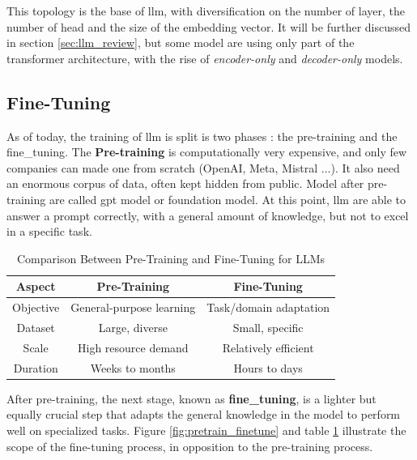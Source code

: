 This topology is the base of \acrshort{llm}, with diversification on the number of layer, the number of head and the size of the embedding vector. It will be further discussed in section \ref{sec:llm_review}, but some model are using only part of the \gls{transformer} architecture, with the rise of \textit{encoder-only} and \textit{decoder-only} models.

\subsection{Fine-Tuning}
\label{sec:fine_tune}
As of today, the training of \acrshort{llm} is split is two phases : the pre-training and the \gls{fine_tuning}. The \textbf{Pre-training} is computationally very expensive, and only few companies can made one from scratch (OpenAI, Meta, Mistral ...). It also need an enormous corpus of data, often kept hidden from public. Model after pre-training are called \acrfull{gpt} model or foundation model. At this point, \acrshort{llm} are able to answer a prompt correctly, with a general amount of knowledge, but not to excel in a specific task.

\begin{table}[h!]
    \centering
    \begin{tabular}{|c|c|c|}
        \hline
        \textbf{Aspect} & \textbf{Pre-Training} & \textbf{Fine-Tuning} \\
        \hline
        Objective & General-purpose learning & Task/domain adaptation \\
        \hline
        Dataset & Large, diverse & Small, specific \\
        \hline
        Scale & High resource demand & Relatively efficient \\
        \hline
        Duration & Weeks to months & Hours to days \\
        \hline
    \end{tabular}
    \caption{Comparison Between Pre-Training and Fine-Tuning for LLMs}
    \label{tab:pretrain_vs_finetune}
\end{table}



After pre-training, the next stage, known as \textbf{\Gls{fine_tuning}}, is a lighter but equally crucial step that adapts the general knowledge in the model to perform well on specialized tasks. Figure \ref{fig:pretrain_finetune} and table \ref{tab:pretrain_vs_finetune} illustrate the scope of the fine-tuning process, in opposition to the pre-training process.

